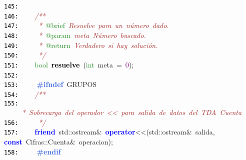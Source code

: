 \documentclass[a4paper,10pt]{scrartcl}
\begin{document}
{   \mbox{}\texttt{\textcolor{Black}{145:}} \ \  \\
   \mbox{}\texttt{\textcolor{Black}{146:}} \ \ \ \ \textit{\textcolor{Brown}{/**}} \\
   \mbox{}\texttt{\textcolor{Black}{147:}} \textit{\textcolor{Brown}{\ \ \ \ \ *\ }}\textcolor{ForestGreen}{@brief}\textit{\textcolor{Brown}{\ Resuelve\ para\ un\ número\ dado.}} \\
   \mbox{}\texttt{\textcolor{Black}{148:}} \textit{\textcolor{Brown}{\ \ \ \ \ *\ }}\textcolor{ForestGreen}{@param}\textit{\textcolor{Brown}{\ meta\ Número\ buscado.}} \\
   \mbox{}\texttt{\textcolor{Black}{149:}} \textit{\textcolor{Brown}{\ \ \ \ \ *\ }}\textcolor{ForestGreen}{@return}\textit{\textcolor{Brown}{\ Verdadero\ si\ hay\ solución.}} \\
   \mbox{}\texttt{\textcolor{Black}{150:}} \textit{\textcolor{Brown}{\ \ \ \ \ */}} \\
   \mbox{}\texttt{\textcolor{Black}{151:}} \ \ \ \ \textcolor{ForestGreen}{bool}\ \textbf{\textcolor{Black}{resuelve}}\ \textcolor{BrickRed}{(}\textcolor{ForestGreen}{int}\ meta\ \textcolor{BrickRed}{=}\ \textcolor{Purple}{0}\textcolor{BrickRed}{);} \\
   \mbox{}\texttt{\textcolor{Black}{152:}} \ \ \ \  \\
   \mbox{}\texttt{\textcolor{Black}{153:}} \textbf{\textcolor{RoyalBlue}{\ \ \ \ \#ifndef}}\ GRUPOS \\
   \mbox{}\texttt{\textcolor{Black}{154:}} \ \ \ \ \textit{\textcolor{Brown}{/**}} \\
   \mbox{}\texttt{\textcolor{Black}{155:}} \textit{\textcolor{Brown}{\ \ \ \ \ *\ Sobrecarga\ del\ operador\ \textless{}\textless{}\ para\ salida\ de\ datos\ del\ TDA\ Cuenta}} \\
   \mbox{}\texttt{\textcolor{Black}{156:}} \textit{\textcolor{Brown}{\ \ \ \ \ */}} \\
   \mbox{}\texttt{\textcolor{Black}{157:}} \ \ \ \ \textbf{\textcolor{Blue}{friend}}\ std\textcolor{BrickRed}{::}ostream\textcolor{BrickRed}{\&}\ \textbf{\textcolor{Blue}{operator}}\textcolor{BrickRed}{\textless{}\textless{}(}std\textcolor{BrickRed}{::}ostream\textcolor{BrickRed}{\&}\ salida\textcolor{BrickRed}{,}\ \\ \textbf{\textcolor{Blue}{const}}\ Cifras\textcolor{BrickRed}{::}Cuenta\textcolor{BrickRed}{\&}\ operacion\textcolor{BrickRed}{);} \\
   \mbox{}\texttt{\textcolor{Black}{158:}} \textbf{\textcolor{RoyalBlue}{\ \ \ \ \#endif}} \\
}
\end{document}
